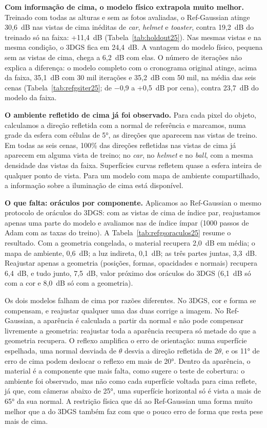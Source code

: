 \textbf{Com informação de cima, o modelo físico extrapola muito melhor.} Treinado com todas as alturas e sem as fotos avaliadas, o Ref-Gaussian atinge 30,6~dB nas vistas de cima inéditas de \textit{car}, \textit{helmet} e \textit{toaster}, contra 19,2~dB do treinado só na faixa: +11,4~dB (Tabela~\ref{tab:holdout25}). Nas mesmas vistas e na mesma condição, o 3DGS fica em 24,4~dB. A vantagem do modelo físico, pequena sem as vistas de cima, chega a 6,2~dB com elas. O número de iterações não explica a diferença: o modelo completo com o cronograma original atinge, acima da faixa, 35,1~dB com 30 mil iterações e 35,2~dB com 50 mil, na média das seis cenas (Tabela~\ref{tab:refgsiter25}; de $-$0,9 a +0,5~dB por cena), contra 23,7~dB do modelo da faixa.



\textbf{O ambiente refletido de cima já foi observado.} Para cada pixel do objeto, calculamos a direção refletida com a normal de referência e marcamos, numa grade da esfera com células de 5°, as direções que aparecem nas vistas de treino. Em todas as seis cenas, 100\% das direções refletidas nas vistas de cima já aparecem em alguma vista de treino; no \textit{car}, no \textit{helmet} e no \textit{ball}, com a mesma densidade das vistas da faixa. Superfícies curvas refletem quase a esfera inteira de qualquer ponto de vista. Para um modelo com mapa de ambiente compartilhado, a informação sobre a iluminação de cima está disponível.

\textbf{O que falta: oráculos por componente.} Aplicamos ao Ref-Gaussian o mesmo protocolo de oráculos do 3DGS: com as vistas de cima de índice par, reajustamos apenas uma parte do modelo e avaliamos nas de índice ímpar (1000 passos de Adam com as taxas do treino). A Tabela~\ref{tab:refgsoraculos25} resume o resultado. Com a geometria congelada, o material recupera 2,0~dB em média; o mapa de ambiente, 0,6~dB; a luz indireta, 0,1~dB; as três partes juntas, 3,3~dB. Reajustar apenas a geometria (posições, formas, opacidades e normais) recupera 6,4~dB, e tudo junto, 7,5~dB, valor próximo dos oráculos do 3DGS (6,1~dB só com a cor e 8,0~dB só com a geometria).



Os dois modelos falham de cima por razões diferentes. No 3DGS, cor e forma se compensam, e reajustar qualquer uma das duas corrige a imagem. No Ref-Gaussian, a aparência é calculada a partir da normal e não pode compensar livremente a geometria: reajustar toda a aparência recupera só metade do que a geometria recupera. O reflexo amplifica o erro de orientação: numa superfície espelhada, uma normal desviada de $\theta$ desvia a direção refletida de $2\theta$, e os 11° de erro de cima podem deslocar o reflexo em mais de 20°. Dentro da aparência, o material é a componente que mais falta, como sugere o teste de cobertura: o ambiente foi observado, mas não como cada superfície voltada para cima reflete, já que, com câmeras abaixo de 25°, uma superfície horizontal só é vista a mais de 65° da sua normal. A restrição física que dá ao Ref-Gaussian uma forma muito melhor que a do 3DGS também faz com que o pouco erro de forma que resta pese mais de cima.


